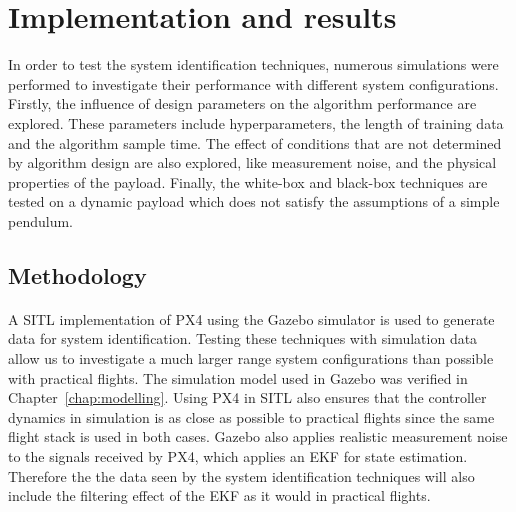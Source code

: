 \section{Implementation and results}

    In order to test the system identification techniques,
    numerous simulations were performed to investigate their performance 
    with different system configurations.
    Firstly, the influence of design parameters on the algorithm performance are explored.
    These parameters include hyperparameters, the length of training data and the algorithm sample time.
    The effect of conditions that are not determined by algorithm design are also explored, 
    like measurement noise, and the physical properties of the payload.
    Finally, the white-box and black-box techniques are tested on a dynamic payload 
    which does not satisfy the assumptions of a simple pendulum.

    \subsection{Methodology}

        \paragraph{}
        A SITL implementation of PX4 \cite{Meier2015} using the Gazebo simulator \cite{Koenig2004} is used to generate data
        for system identification.
        Testing these techniques with simulation data allow us to investigate a much larger range system configurations 
        than possible with practical flights.
        The simulation model used in Gazebo was verified in Chapter~\ref{chap:modelling}.
        Using PX4 in SITL also ensures that the controller dynamics in simulation 
        is as close as possible to practical flights since the same flight stack is used in both cases.
        Gazebo also applies realistic measurement noise to the signals received by PX4, 
        which applies an EKF for state estimation.
        Therefore the the data seen by the system identification techniques 
        will also include the filtering effect of the EKF as it would in practical flights.

